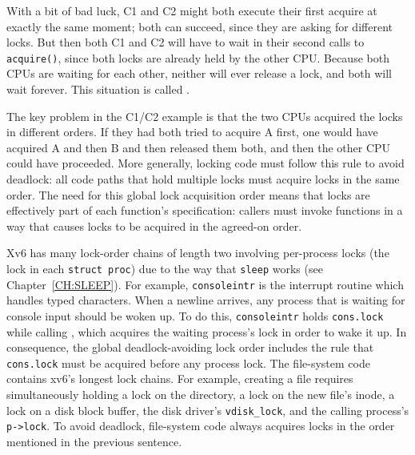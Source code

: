 \begin{center}
  
\end{center}

With a bit of bad luck, C1 and C2 might both execute their first
acquire at exactly the same moment; both can succeed, since they are
asking for different locks. But then both C1 and C2 will have to wait
in their second calls to {\tt acquire()}, since both locks are already
held by the other CPU. Because both CPUs are waiting for each
other, neither will ever release a lock, and both will wait forever.
This situation is called .

The key problem in the C1/C2 example is that the two CPUs acquired
the locks in different orders. If they had both tried to acquire A
first, one would have acquired A and then B and then released them both,
and then the other CPU could have proceeded. More generally,
locking code must follow this rule to avoid deadlock: all code paths
that hold multiple locks must acquire locks in the same order. The
need for this global lock acquisition order means that locks are
effectively part of each function's specification: callers must invoke
functions in a way that causes locks to be acquired in the agreed-on
order.

Xv6 has many lock-order chains of length two involving
per-process locks
(the lock in each
\lstinline{struct proc})
due to the way that
\lstinline{sleep}
works (see Chapter~\ref{CH:SLEEP}).
For example,
\lstinline{consoleintr}
is the interrupt routine which handles typed characters.
When a newline arrives, any process that is waiting for
console input should be woken up.
To do this,
\lstinline{consoleintr}
holds
\lstinline{cons.lock}
while calling 
,
which acquires 
the waiting process's lock in order to wake it up.
In consequence, the global deadlock-avoiding
lock order includes the rule that
\lstinline{cons.lock}
must be acquired before any process lock.
The file-system code contains xv6's longest lock chains.
For example, creating a file requires simultaneously
holding a lock on the directory, a lock on the new file's inode,
a lock on a disk block buffer, 
the disk driver's \lstinline{vdisk_lock},
and
the calling process's \lstinline{p->lock}.
To avoid deadlock, file-system code always acquires locks in the order
mentioned in the previous sentence.

